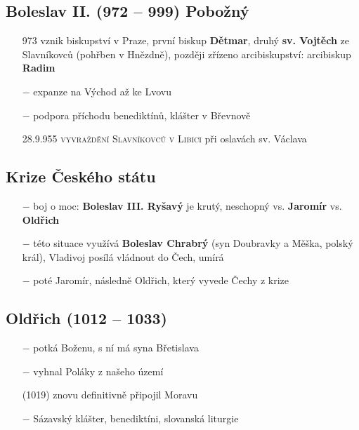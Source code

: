 \documentclass{article}
\begin{document}
\subsection*{Boleslav II. (972 -- 999) Pobožný}
\begin{itemize}
    \vspace{-0.5em}
    \setlength\itemsep{0.15em}
    \item[973] vznik biskupství v Praze, první biskup \textbf{Dětmar}, druhý \textbf{sv. Vojtěch} ze Slavníkovců (pohřben v Hnězdně), později zřízeno arcibiskupství: arcibiskup \textbf{Radim}
    \item[$-$] expanze na Východ až ke Lvovu
    \item[$-$] podpora příchodu benediktínů, klášter v Břevnově
    \item[28.9.955] \textsc{vyvraždění Slavníkovců v Libici} při oslavách sv. Václava
\end{itemize}

\subsection*{Krize Českého státu}
\begin{itemize}
    \vspace{-0.5em}
    \setlength\itemsep{0.15em}
    \item[$-$] boj o moc: \textbf{Boleslav III. Ryšavý} je krutý, neschopný vs. \textbf{Jaromír} vs. \textbf{Oldřich}
    \item[$-$] této situace využívá \textbf{Boleslav Chrabrý} (syn Doubravky a Měška, polský král), Vladivoj posílá vládnout do Čech, umírá
    \item[$-$] poté Jaromír, následně Oldřich, který vyvede Čechy z krize
\end{itemize}

\subsection*{Oldřich (1012 -- 1033)}
\begin{itemize}
    \vspace{-0.5em}
    \setlength\itemsep{0.15em}
    \item[$-$] potká Boženu, s ní má syna Břetislava
    \item[$-$] vyhnal Poláky z našeho území
    \item[(1019)] znovu definitivně připojil Moravu
    \item[$-$] Sázavský klášter, benediktíni, slovanská liturgie
\end{itemize}
\end{document}
